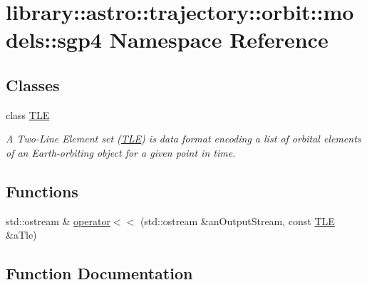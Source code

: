\hypertarget{namespacelibrary_1_1astro_1_1trajectory_1_1orbit_1_1models_1_1sgp4}{}\section{library\+:\+:astro\+:\+:trajectory\+:\+:orbit\+:\+:models\+:\+:sgp4 Namespace Reference}
\label{namespacelibrary_1_1astro_1_1trajectory_1_1orbit_1_1models_1_1sgp4}
\subsection*{Classes}
\begin{DoxyCompactItemize}
\item 
class \hyperlink{classlibrary_1_1astro_1_1trajectory_1_1orbit_1_1models_1_1sgp4_1_1_t_l_e}{T\+LE}
\begin{DoxyCompactList}\small\item\em A Two-\/\+Line Element set (\hyperlink{classlibrary_1_1astro_1_1trajectory_1_1orbit_1_1models_1_1sgp4_1_1_t_l_e}{T\+LE}) is data format encoding a list of orbital elements of an Earth-\/orbiting object for a given point in time. \end{DoxyCompactList}\end{DoxyCompactItemize}
\subsection*{Functions}
\begin{DoxyCompactItemize}
\item 
std\+::ostream \& \hyperlink{namespacelibrary_1_1astro_1_1trajectory_1_1orbit_1_1models_1_1sgp4_a631288dbc9cbbb513335bea73ca13c80}{operator$<$$<$} (std\+::ostream \&an\+Output\+Stream, const \hyperlink{classlibrary_1_1astro_1_1trajectory_1_1orbit_1_1models_1_1sgp4_1_1_t_l_e}{T\+LE} \&a\+Tle)
\end{DoxyCompactItemize}


\subsection{Function Documentation}
\mbox{\label{namespacelibrary_1_1astro_1_1trajectory_1_1orbit_1_1models_1_1sgp4_a631288dbc9cbbb513335bea73ca13c80}} 
